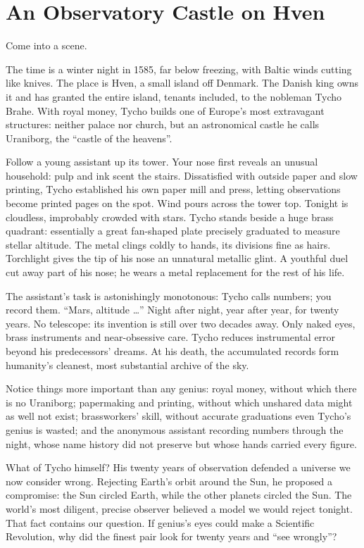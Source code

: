 \section{An Observatory Castle on Hven}
Come into a scene.

The time is a winter night in 1585, far below freezing, with Baltic winds cutting like knives. The place is Hven, a small island off Denmark. The Danish king owns it and has granted the entire island, tenants included, to the nobleman Tycho Brahe. With royal money, Tycho builds one of Europe's most extravagant structures: neither palace nor church, but an astronomical castle he calls Uraniborg, the ``castle of the heavens''.

Follow a young assistant up its tower. Your nose first reveals an unusual household: pulp and ink scent the stairs. Dissatisfied with outside paper and slow printing, Tycho established his own paper mill and press, letting observations become printed pages on the spot. Wind pours across the tower top. Tonight is cloudless, improbably crowded with stars. Tycho stands beside a huge brass quadrant: essentially a great fan-shaped plate precisely graduated to measure stellar altitude. The metal clings coldly to hands, its divisions fine as hairs. Torchlight gives the tip of his nose an unnatural metallic glint. A youthful duel cut away part of his nose; he wears a metal replacement for the rest of his life.

The assistant's task is astonishingly monotonous: Tycho calls numbers; you record them. ``Mars, altitude \ldots'' Night after night, year after year, for twenty years. No telescope: its invention is still over two decades away. Only naked eyes, brass instruments and near-obsessive care. Tycho reduces instrumental error beyond his predecessors' dreams. At his death, the accumulated records form humanity's cleanest, most substantial archive of the sky.

Notice things more important than any genius: royal money, without which there is no Uraniborg; papermaking and printing, without which unshared data might as well not exist; brassworkers' skill, without accurate graduations even Tycho's genius is wasted; and the anonymous assistant recording numbers through the night, whose name history did not preserve but whose hands carried every figure.

What of Tycho himself? His twenty years of observation defended a universe we now consider wrong. Rejecting Earth's orbit around the Sun, he proposed a compromise: the Sun circled Earth, while the other planets circled the Sun. The world's most diligent, precise observer believed a model we would reject tonight. That fact contains our question. If genius's eyes could make a Scientific Revolution, why did the finest pair look for twenty years and ``see wrongly''?

